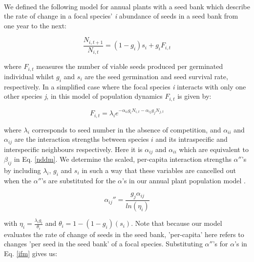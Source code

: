 \documentclass[a4,12pt]{article}
\begin{document}
        \paragraph{} 
        We defined the following model for annual plants with a seed bank \parencite{Levine2009, Mayfield2017, Bimler2018} which describe the rate of change in a focal species' \textit{i} abundance of seeds in a seed bank from one year to the next: 
    
            \begin{equation}
                \frac{N_{i, t+1}}{N_{i, t}} = \left( 1 - g_{i} \right) s_{i} + g_{i}F_{i, t}
                \label{ifm}
            \end{equation}
        
        where \(F_{i,t}\) measures the number of viable seeds produced per germinated individual whilst \(g_{i}\) and \(s_{i}\) are the seed germination and seed survival rate, respectively. In a simplified case where the focal species \textit{i} interacts with only one other species \textit{j}, in this model of population dynamics \(F_{i,t}\) is given by:

            \begin{equation}
                F_{i,t} = \lambda_{i} e^{- \alpha_{ii} g_{i} N_{i, t} -  \alpha_{ij} g_{j} N_{j, t} }
                \label{fecundity}   
            \end{equation}

        where \(\lambda_{i}\) corresponds to seed number in the absence of competition, and \(\alpha_{ii}\) and \(\alpha_{ij}\) are the interaction strengths between species \(i\) and its intraspecific and interspecific neighbours respectively. Here it is \(\alpha_{ij}\) and \(\alpha_{ii}\) which are equivalent to \(\beta_{ij}\) in Eq. \ref{nddm}. 
        We determine the scaled, per-capita interaction strengths ${\alpha}''$'s by including \(\lambda_{i}\), \(g_{i}\) and \(s_{i}\) in such a way that these variables are cancelled out when the ${\alpha}''$'s are substituted for the $\alpha$'s in our annual plant population model \parencite{Godoy2014, Bimler2018}. 

        \begin{equation}
            {\alpha_{ij}}'' = \frac{g_{j} \alpha_{ij}}{ln(\eta_{i})}
        \end{equation}

        with $\eta_{i} = \frac{\lambda_{i} g_{i}}{\theta_{i}}$ and $\theta_{i} = 1 - (1 - g_{i})(s_{i})$. %
        Note that because our model evaluates the rate of change of seeds in the seed bank, 'per-capita' here refers to changes 'per seed in the seed bank' of a focal species. Substituting ${\alpha}''$'s for $\alpha$'s in Eq. \ref{ifm} gives us: 
        
\end{document}

